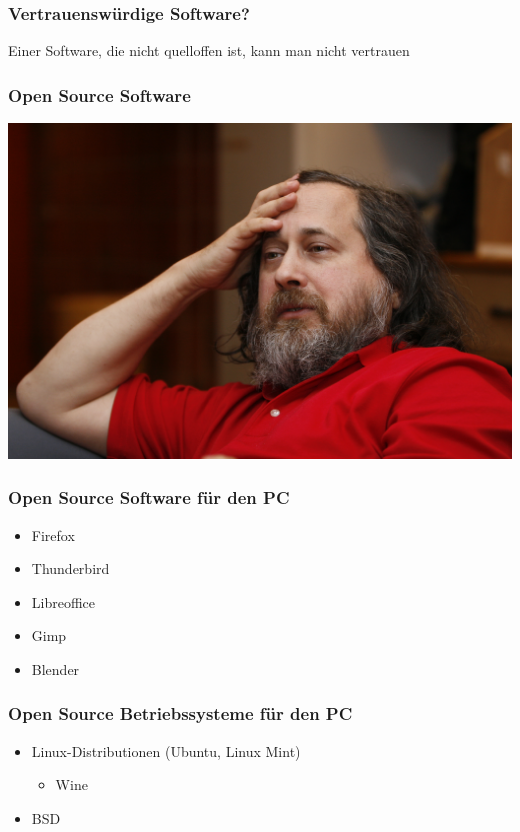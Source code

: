 \documentclass[12pt]{beamer}
\begin{document}
\begin{frame}
    \frametitle{Vertrauenswürdige Software?}
    \begin{center}\Large
        Einer Software, die nicht quelloffen ist, kann man nicht vertrauen
    \end{center}
\end{frame}

\begin{frame}
    \frametitle{Open Source Software}
    \begin{center}
      \includegraphics[height=0.7\textheight]{img/stallman.jpg}
    \end{center}
\end{frame}

\begin{frame}
    \frametitle{Open Source Software für den PC}
    \begin{itemize}
      \item Firefox
      \item Thunderbird
      \item Libreoffice
      \item Gimp
      \item Blender
    \end{itemize}
\end{frame}

\begin{frame}
    \frametitle{Open Source Betriebssysteme für den PC}
    \begin{itemize}
      \item Linux-Distributionen (Ubuntu, Linux Mint)
        \begin{itemize}
          \item Wine
      \end{itemize}
      \item BSD
    \end{itemize}
\end{frame}
\end{document}
